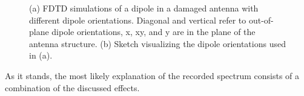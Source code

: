 \begin{figure}[!htb]
\begin{subfigure}{ 0.25\linewidth}
						\caption{}
						\label{subfig::dipole_damaged_antenna_sketch}
					\end{subfigure}
					\caption[FDTD simulation of a damaged antenna]{(a) FDTD simulations of a dipole in a damaged antenna with different dipole orientations. Diagonal and vertical refer to out-of-plane dipole orientations, x, xy, and y are in the plane of the antenna structure. (b) Sketch visualizing the dipole orientations used in (a).}
					\label{fig::dipole_damaged_antenna}
				\end{figure}
				As it stands, the most likely explanation of the recorded spectrum consists of a combination of the discussed effects.


